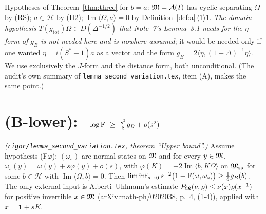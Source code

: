 \documentclass[11pt]{article}
\newcommand{\Om}{\Omega}
\newcommand{\one}{\mathbf 1}
\newcommand{\Hil}{\mathcal H}
\newcommand{\ip}[2]{\langle#1,#2\rangle}
\newcommand{\Msa}{\cM_{\mathrm{sa}}}
\newcommand{\gB}{g_B}
\newcommand{\gtot}{g_{\mathrm{tot}}}
\begin{document}
\begin{verdictok}
Hypotheses of Theorem~\ref{thm:three} for $b=a$: $\mathfrak M=\mathcal A(I)$ has cyclic separating $\Om$ by (RS);
$a\in\Hil$ by (H2); $\operatorname{Im}\ip\Om a=0$ by Definition~\ref{def:a}\,$\langle1\rangle1$.
\emph{The domain hypothesis $T(\gtot)\Om\in D(\Delta^{-1/2})$ that Note~7's Lemma~3.1 needs for the
$\eta$-form of $\gB$ is not needed here and is nowhere assumed}; it would be needed only if one wanted
$\eta=i(S^*-1)a$ as a vector and the form $\gB=2\ip\eta{(1+\Delta)^{-1}\eta}$.  We use exclusively the
$J$-form and the distance form, both unconditional.  (The audit's own summary of
\texttt{lemma\_second\_variation.tex}, item (A), makes the same point.)
\end{verdictok}

\section{(B-lower): $-\log\Fid\ \ge\ \frac{s^2}8\gB+o(s^2)$}\label{sec:lower}

\begin{theorem}\label{thm:albertiupper}
\emph{(\texttt{rigor/lemma\_second\_variation.tex}, theorem ``Upper bound''.)}  Assume hypothesis
\textup{(F$\varphi$)}: $(\omega_s)$ are normal states on $\mathfrak M$ and for every $y\in\mathfrak M$,
$\omega_s(y)=\omega(y)+s\varphi(y)+o(s)$, with $\varphi(K)=-2\operatorname{Im}\ip b{K\Om}$ on $\Msa$ for some
$b\in\Hil$ with $\operatorname{Im}\ip\Om b=0$.  Then
$\liminf_{s\to0}s^{-2}\bigl(1-\Fid(\omega,\omega_s)\bigr)\ge\frac18\gB(b)$.
The only external input is Alberti--Uhlmann's estimate $P_{\mathfrak M}(\nu,\varrho)\le\nu(x)\varrho(x^{-1})$
for positive invertible $x\in\mathfrak M$ (arXiv:math-ph/0202038, p.~4, (1-4)), applied with $x=\one+sK$.
\end{theorem}
\end{document}
